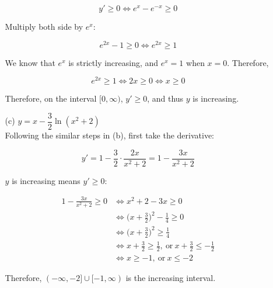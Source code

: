 \documentclass{article}
\begin{document}
\begin{enumerate}
\begin{enumerate}
            $$ y' \geq 0 \iff e^x - e^{-x} \geq 0 $$
            
            Multiply both side by $e^x$:
            
            $$ e^{2x} - 1 \geq 0 \iff e^{2x} \geq 1 $$
            
            We know that $e^x$ is strictly increasing, and $e^x = 1$ when $x = 0$. Therefore,
            
            $$ e^{2x} \geq 1 \iff 2x \geq 0 \iff x \geq 0 $$
            
            Therefore, on the interval $[0, \infty)$, $y' \geq 0$, and thus $y$ is increasing. \\
            
            \item[(c)] $ y = x - \dfrac{3}{2}\ln{(x^2+2)} $ \\
            
            Following the similar steps in (b), first take the derivative:
            
            $$ y' = 1 - \frac{3}{2} \cdot \frac{2x}{x^2 + 2} = 1 - \frac{3x}{x^2 + 2} $$
            
            $y$ is increasing means $y' \geq 0$:
            
            \begin{equation*}
            \begin{aligned}
                1 - \frac{3x}{x^2 + 2} \geq 0 &\iff
                x^2 + 2 - 3x \geq 0 \\ &\iff 
                \Big( x + \frac{3}{2} \Big)^2 - \frac{1}{4} \geq 0 \\ &\iff 
                \Big( x + \frac{3}{2} \Big)^2 \geq \frac{1}{4} \\ &\iff
                x + \frac{3}{2} \geq \frac{1}{2}, \ \textrm{or}\  x + \frac{3}{2} \leq -\frac{1}{2} \\ &\iff
                x \geq -1,\ \textrm{or}\ x \leq -2
            \end{aligned}
            \end{equation*}
            
            Therefore, $(-\infty, -2] \cup [-1, \infty)$ is the increasing interval.
           
            
        \end{enumerate}
    
    \end{enumerate}

    
\end{document}
